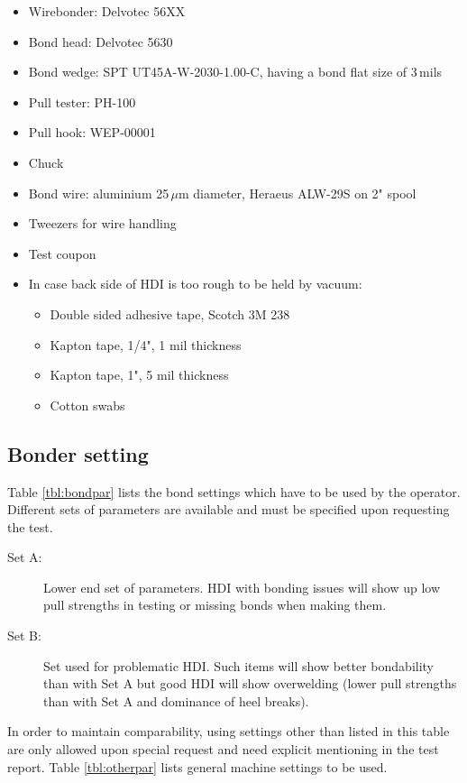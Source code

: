 \documentclass[10pt]{unlsilabsop}
\begin{document}
\begin{itemize}
    \item Wirebonder: Delvotec 56XX
    \item Bond head: Delvotec 5630
    \item Bond wedge: SPT UT45A-W-2030-1.00-C, having a bond flat size of 3\,mils
    \item Pull tester: PH-100
    \item Pull hook: WEP-00001
    \item Chuck
    \item Bond wire: aluminium 25\,$\mu$m diameter, Heraeus ALW-29S on 2" spool
    \item Tweezers for wire handling
    \item Test coupon
    \item In case back side of HDI is too rough to be held by vacuum:
    \begin{itemize}
	\item Double sided adhesive tape, Scotch 3M 238
	\item Kapton tape, 1/4", 1 mil thickness
	\item Kapton tape, 1", 5 mil thickness
	\item Cotton swabs
    \end{itemize}
\end{itemize}

\subsection{Bonder setting}

Table \ref{tbl:bondpar} lists the bond settings which have to be used by the operator. Different sets of parameters are available and must be specified upon requesting the test.
\begin{description}
    \item[Set A:] Lower end set of parameters. HDI with bonding issues will show up low pull strengths in testing or missing bonds when making them.
    \item[Set B:] Set used for problematic HDI. Such items will show better bondability than with Set A but good HDI will show overwelding (lower pull strengths than with Set A and dominance of heel breaks).
\end{description}
In order to maintain comparability, using settings other than listed in this table are only allowed upon special request and need explicit mentioning in the test report. Table \ref{tbl:otherpar} lists general machine settings to be used.
\end{document}
